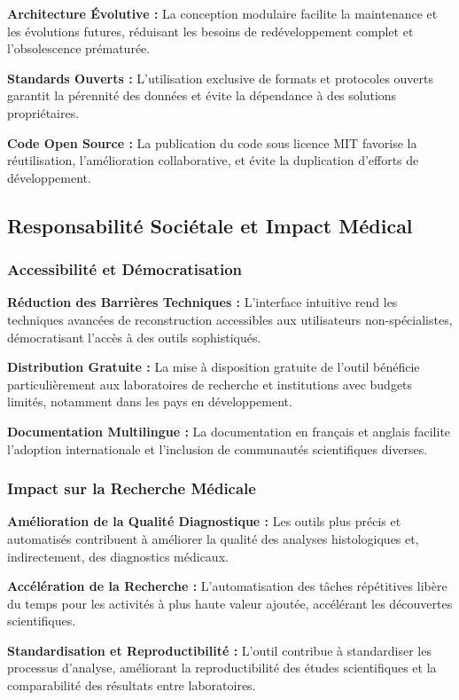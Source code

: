 \documentclass[12pt,a4paper]{article}
\begin{document}
\textbf{Architecture Évolutive :} La conception modulaire facilite la maintenance et les évolutions futures, réduisant les besoins de redéveloppement complet et l'obsolescence prématurée.

\textbf{Standards Ouverts :} L'utilisation exclusive de formats et protocoles ouverts garantit la pérennité des données et évite la dépendance à des solutions propriétaires.

\textbf{Code Open Source :} La publication du code sous licence MIT favorise la réutilisation, l'amélioration collaborative, et évite la duplication d'efforts de développement.

\subsection{Responsabilité Sociétale et Impact Médical}

\subsubsection{Accessibilité et Démocratisation}

\textbf{Réduction des Barrières Techniques :} L'interface intuitive rend les techniques avancées de reconstruction accessibles aux utilisateurs non-spécialistes, démocratisant l'accès à des outils sophistiqués.

\textbf{Distribution Gratuite :} La mise à disposition gratuite de l'outil bénéficie particulièrement aux laboratoires de recherche et institutions avec budgets limités, notamment dans les pays en développement.

\textbf{Documentation Multilingue :} La documentation en français et anglais facilite l'adoption internationale et l'inclusion de communautés scientifiques diverses.

\subsubsection{Impact sur la Recherche Médicale}

\textbf{Amélioration de la Qualité Diagnostique :} Les outils plus précis et automatisés contribuent à améliorer la qualité des analyses histologiques et, indirectement, des diagnostics médicaux.

\textbf{Accélération de la Recherche :} L'automatisation des tâches répétitives libère du temps pour les activités à plus haute valeur ajoutée, accélérant les découvertes scientifiques.

\textbf{Standardisation et Reproductibilité :} L'outil contribue à standardiser les processus d'analyse, améliorant la reproductibilité des études scientifiques et la comparabilité des résultats entre laboratoires.
\end{document}
